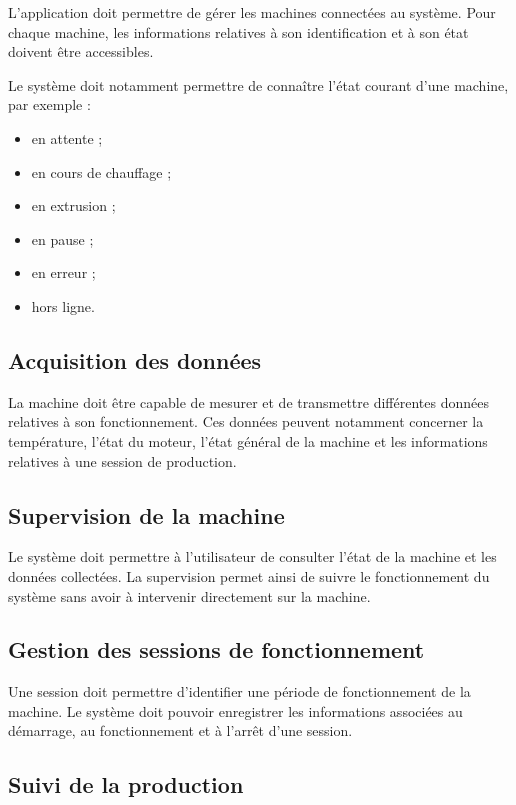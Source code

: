 L'application doit permettre de gérer les machines connectées au système.
Pour chaque machine, les informations relatives à son identification et à
son état doivent être accessibles.

Le système doit notamment permettre de connaître l'état courant d'une
machine, par exemple :

\begin{itemize}
    \item en attente ;
    \item en cours de chauffage ;
    \item en extrusion ;
    \item en pause ;
    \item en erreur ;
    \item hors ligne.
\end{itemize}

\subsection{Acquisition des données}

La machine doit être capable de mesurer et de transmettre différentes
données relatives à son fonctionnement. Ces données peuvent notamment
concerner la température, l'état du moteur, l'état général de la machine
et les informations relatives à une session de production.

\subsection{Supervision de la machine}

Le système doit permettre à l'utilisateur de consulter l'état de la
machine et les données collectées. La supervision permet ainsi de suivre
le fonctionnement du système sans avoir à intervenir directement sur la
machine.

\subsection{Gestion des sessions de fonctionnement}

Une session doit permettre d'identifier une période de fonctionnement de
la machine. Le système doit pouvoir enregistrer les informations
associées au démarrage, au fonctionnement et à l'arrêt d'une session.

\subsection{Suivi de la production}

